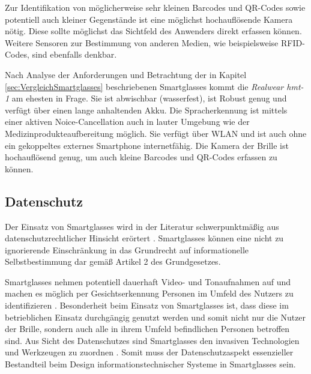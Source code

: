 Zur Identifikation von möglicherweise sehr kleinen Barcodes und QR-Codes sowie potentiell auch kleiner Gegenstände ist eine möglichst hochauflösende Kamera nötig. Diese sollte möglichst das Sichtfeld des Anwenders direkt erfassen können. Weitere Sensoren zur Bestimmung von anderen Medien, wie beispielsweise RFID-Codes, sind ebenfalls denkbar.
%
%

Nach Analyse der Anforderungen und Betrachtung der in Kapitel \ref{sec:VergleichSmartglasses} beschriebenen Smartglasses kommt die \emph{Realwear hmt-1} am ehesten in Frage. Sie ist abwischbar (wasserfest), ist Robust genug und verfügt über einen lange anhaltenden Akku. Die Spracherkennung ist mittels einer aktiven Noice-Cancellation auch in lauter Umgebung wie der Medizinprodukteaufbereitung möglich. Sie verfügt über WLAN und ist auch ohne ein gekoppeltes externes Smartphone internetfähig. Die Kamera der Brille ist hochauflösend genug, um auch kleine Barcodes und QR-Codes erfassen zu können.
%
%
%
%
%
%
%
\subsection{Datenschutz}
\label{sec:Datenschutz}
Der Einsatz von Smartglasses wird in der Literatur schwerpunktmäßig aus datenschutzrechtlicher Hinsicht erörtert \cite{Berkemeier2017}. Smartglasses können eine nicht zu ignorierende Einschränkung in das Grundrecht auf informationelle Selbstbestimmung dar gemäß Artikel 2 des Grundgesetzes.

Smartglasses nehmen potentiell dauerhaft Video- und Tonaufnahmen auf und machen es möglich per Gesichtserkennung Personen im Umfeld des Nutzers zu identifizieren \cite[S.~38f]{Schwenke2016}. Besonderheit beim Einsatz von Smartglasses ist, dass diese im betrieblichen Einsatz durchgängig genutzt werden und somit nicht nur die Nutzer der Brille, sondern auch alle in ihrem Umfeld befindlichen Personen betroffen sind. Aus Sicht des Datenschutzes sind Smartglasses den invasiven Technologien und Werkzeugen zu zuordnen \cite{Berkemeier2017}. Somit muss der Datenschutzaspekt essenzieller Bestandteil beim Design informationstechnischer Systeme in Smartglasses sein. 

